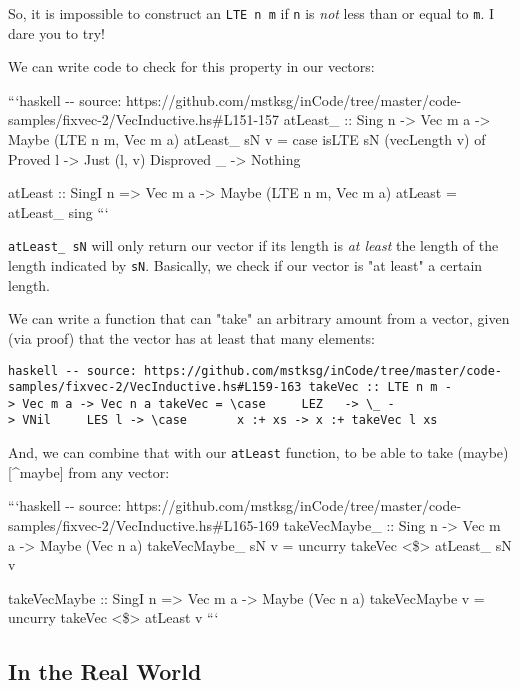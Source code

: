 \documentclass[]{article}
\begin{document}
So, it is impossible to construct an \texttt{LTE\ n\ m} if \texttt{n} is
\emph{not} less than or equal to \texttt{m}. I dare you to try!

We can write code to check for this property in our vectors:

```haskell -\/- source:
https://github.com/mstksg/inCode/tree/master/code-samples/fixvec-2/VecInductive.hs\#L151-157
atLeast\_ :: Sing n -\textgreater{} Vec m a -\textgreater{} Maybe (LTE n m, Vec
m a) atLeast\_ sN v = case isLTE sN (vecLength v) of Proved l -\textgreater{}
Just (l, v) Disproved \_ -\textgreater{} Nothing

atLeast :: SingI n =\textgreater{} Vec m a -\textgreater{} Maybe (LTE n m, Vec m
a) atLeast = atLeast\_ sing ```

\texttt{atLeast\_\ sN} will only return our vector if its length is \emph{at
least} the length of the length indicated by \texttt{sN}. Basically, we check if
our vector is "at least" a certain length.

We can write a function that can "take" an arbitrary amount from a vector, given
(via proof) that the vector has at least that many elements:

\texttt{haskell\ -\/-\ source:\ https://github.com/mstksg/inCode/tree/master/code-samples/fixvec-2/VecInductive.hs\#L159-163\ takeVec\ ::\ LTE\ n\ m\ -\textgreater{}\ Vec\ m\ a\ -\textgreater{}\ Vec\ n\ a\ takeVec\ =\ \textbackslash{}case\ \ \ \ \ LEZ\ \ \ -\textgreater{}\ \textbackslash{}\_\ -\textgreater{}\ VNil\ \ \ \ \ LES\ l\ -\textgreater{}\ \textbackslash{}case\ \ \ \ \ \ \ x\ :+\ xs\ -\textgreater{}\ x\ :+\ takeVec\ l\ xs}

And, we can combine that with our \texttt{atLeast} function, to be able to take
(maybe){[}\^{}maybe{]} from any vector:

```haskell -\/- source:
https://github.com/mstksg/inCode/tree/master/code-samples/fixvec-2/VecInductive.hs\#L165-169
takeVecMaybe\_ :: Sing n -\textgreater{} Vec m a -\textgreater{} Maybe (Vec n a)
takeVecMaybe\_ sN v = uncurry takeVec \textless{}\$\textgreater{} atLeast\_ sN v

takeVecMaybe :: SingI n =\textgreater{} Vec m a -\textgreater{} Maybe (Vec n a)
takeVecMaybe v = uncurry takeVec \textless{}\$\textgreater{} atLeast v ```

\subsection{In the Real World}
\end{document}
